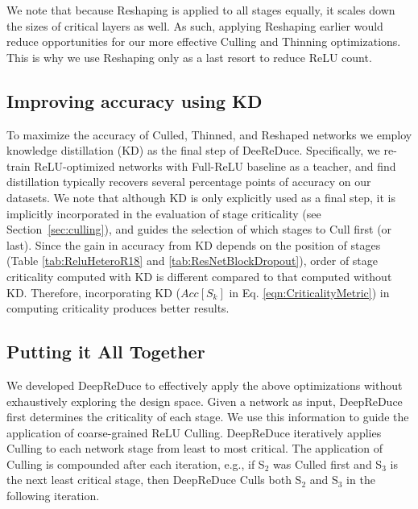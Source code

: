We note that because Reshaping is
applied to all stages equally, it scales down the sizes of critical layers as well. 
As such, applying Reshaping earlier would reduce opportunities for our more effective Culling and Thinning optimizations. 
This is why we use Reshaping only as a last resort to reduce ReLU count.


\subsection{Improving accuracy using KD}
To maximize the accuracy of Culled, Thinned, and Reshaped networks we employ
knowledge distillation (KD) as the final step of DeeReDuce. 
Specifically, we re-train ReLU-optimized networks with Full-ReLU baseline  as a teacher, and
find distillation typically recovers several percentage points of accuracy on our datasets.
We note that although KD is only explicitly used as a final step, it is implicitly incorporated in the evaluation of stage criticality (see Section~\ref{sec:culling}), and guides the selection of which stages to Cull first (or last). 
Since the gain in accuracy from KD depends on the position of stages (Table \ref{tab:ReluHeteroR18} and \ref{tab:ResNetBlockDropout}), order of stage criticality computed with KD is different compared to that computed without KD. 
Therefore, incorporating KD ($Acc [S_k]$ in Eq. \ref{eqn:CriticalityMetric}) in computing criticality produces better results. 


\subsection{Putting it All Together}

We developed DeepReDuce to effectively apply the above optimizations without exhaustively exploring the design space.
Given a network as input, DeepReDuce first determines the criticality of each stage.
We use this information to guide the application of coarse-grained ReLU Culling.
DeepReDuce iteratively applies Culling to each network stage from least to most critical.
The application of Culling is compounded after each iteration,
e.g., if S$_{2}$ was Culled first and S$_{3}$ is the next least critical stage, 
then DeepReDuce Culls both S$_{2}$ and S$_{3}$ in the following iteration.


